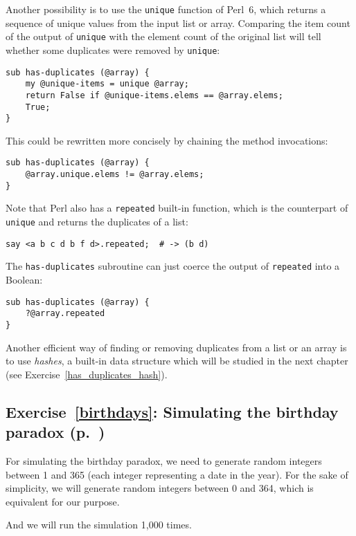 {Another possibility is to use the {\tt unique} function 
of Perl~6, which returns a sequence of unique values 
from the input list or array. Comparing the item count 
of the output of {\tt unique} with the element count of 
the original list will tell whether some duplicates were 
removed by {\tt unique}:

\begin{verbatim}
sub has-duplicates (@array) {
    my @unique-items = unique @array;
    return False if @unique-items.elems == @array.elems;
    True;
}
\end{verbatim}

This could be rewritten more concisely by chaining the 
method invocations:

\begin{verbatim}
sub has-duplicates (@array) {
    @array.unique.elems != @array.elems;
}
\end{verbatim}

Note that Perl also has a {\tt repeated} built-in 
function, which is the counterpart of {\tt unique} 
and returns the duplicates of a list:
\begin{verbatim}
say <a b c d b f d>.repeated;  # -> (b d)
\end{verbatim}

The {\tt has-duplicates} subroutine can just coerce 
the output of {\tt repeated} into a Boolean:
\begin{verbatim}
sub has-duplicates (@array) {
    ?@array.repeated
}
\end{verbatim}


Another efficient way of finding or removing duplicates 
from a list or an array is to use \emph{hashes}, a 
built-in data structure which will be studied in the 
next chapter (see Exercise~\ref{has_duplicates_hash}).

\subsection{Exercise~\ref{birthdays}: Simulating the birthday paradox (p.~\pageref{birthdays})}
\label{sol_birthdays}

For simulating the birthday paradox, we need to generate 
random integers between 1 and 365 (each integer 
representing a date in the year). For the sake of 
simplicity, we will generate random integers between 
0 and 364, which is equivalent for our purpose.

And we will run the simulation 1,000 times.

}
